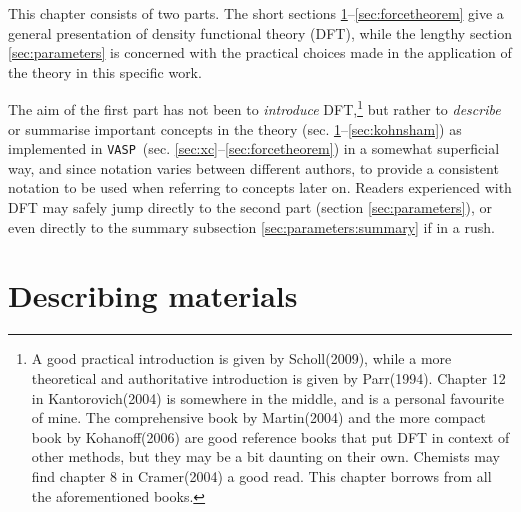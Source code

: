 \documentclass[11pt,bibliography=totoc,index=totoc]{scrbook}   %
\newcommand{\vasp}{{\texttt{VASP}}} %
\begin{document}
This chapter consists of two parts. The short sections \ref{sec:materials}--\ref{sec:forcetheorem} give a general presentation of density functional theory (DFT), 
while the lengthy section \ref{sec:parameters} is concerned with the practical choices made in the application of the theory in this specific work.

The aim of the first part has not been to \emph{introduce} DFT,\footnote{
A good practical introduction is given by Scholl(2009)\cite{Scholl:2009}, while a more theoretical and authoritative introduction is given by Parr(1994)\cite{Parr:1994}.
Chapter 12 in Kantorovich(2004)\cite{Kantorovich:2004} is somewhere in the middle, and is a personal favourite of mine.
The comprehensive book by Martin(2004)\cite{Martin:2004} and the more compact book by Kohanoff(2006)\cite{Kohanoff:2006} are good reference books that put DFT in context of other methods, 
but they may be a bit daunting on their own.
Chemists may find chapter 8 in Cramer(2004)\cite{Cramer:2004} a good read.
This chapter borrows from all the aforementioned books.
}
but rather to \emph{describe} or summarise important concepts in the theory (sec. \ref{sec:materials}--\ref{sec:kohnsham}) as implemented in \vasp\ (sec. \ref{sec:xc}--\ref{sec:forcetheorem}) in a somewhat superficial way, 
and since notation varies between different authors, to provide a consistent notation to be used when referring to concepts later on. 
Readers experienced with DFT may safely jump directly to the second part (section \ref{sec:parameters}),
or even directly to the summary subsection \ref{sec:parameters:summary} if in a rush. 



%
\section{Describing materials}\label{sec:materials}
%
\end{document}
